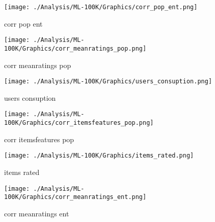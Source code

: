 \documentclass{article}
\begin{document}
	\begin{figure}[!ht]
	    \centering
		\begin{minipage}{0.5\textwidth}
		    \centering
		    \texttt{[image: ./Analysis/ML-100K/Graphics/corr\_pop\_ent.png]} 
		    \caption{corr pop ent}
		    \label{fig:figura1minipg}
		\end{minipage}\hfill
	    \begin{minipage}{0.5\textwidth}
		    \centering
		    \texttt{[image: ./Analysis/ML-100K/Graphics/corr\_meanratings\_pop.png]} 
		    \caption{corr meanratings pop}
		    \label{fig:figura1minipg}
		\end{minipage}\hfill
	    \begin{minipage}{0.5\textwidth}
		    \centering
		    \texttt{[image: ./Analysis/ML-100K/Graphics/users\_consuption.png]} 
		    \caption{users consuption}
		    \label{fig:figura1minipg}
		\end{minipage}\hfill
	    \begin{minipage}{0.5\textwidth}
		    \centering
		    \texttt{[image: ./Analysis/ML-100K/Graphics/corr\_itemsfeatures\_pop.png]} 
		    \caption{corr itemsfeatures pop}
		    \label{fig:figura1minipg}
		\end{minipage}\hfill
	    \begin{minipage}{0.5\textwidth}
		    \centering
		    \texttt{[image: ./Analysis/ML-100K/Graphics/items\_rated.png]} 
		    \caption{items rated}
		    \label{fig:figura1minipg}
		\end{minipage}\hfill
	    \begin{minipage}{0.5\textwidth}
		    \centering
		    \texttt{[image: ./Analysis/ML-100K/Graphics/corr\_meanratings\_ent.png]} 
		    \caption{corr meanratings ent}
		    \label{fig:figura1minipg}
		\end{minipage}\hfill
	    
		\label{fig:figurasminipg}
	\end{figure}
			
\end{document}
